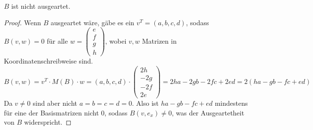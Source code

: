 \documentclass[10pt,a4paper]{article}
\begin{document}
$B$ ist nicht ausgeartet.
\begin{proof}
Wenn $B$ ausgeartet wäre, gäbe es ein $v^{T} = (a, b, c, d)$, sodass $B(v, w) = 0$ für alle $w = \begin{pmatrix}
e\\f\\g\\h
\end{pmatrix}$, wobei $v, w$ Matrizen in Koordinatenschreibweise sind.
\begin{equation}
B(v, w) = v^{T} \cdot M(B) \cdot w = (a, b, c, d) \cdot \begin{pmatrix}
2h\\-2g\\-2f\\2e
\end{pmatrix} = 2ha - 2gb - 2fc + 2ed = 2(ha - gb - fc + ed)
\end{equation}
Da $v \ne 0$ sind aber nicht $a = b = c = d = 0$.
Also ist $ha - gb - fc + ed$ mindestens für eine der Basismatrizen nicht $0$, sodass $B(v, e_{x}) \ne 0$, was der Ausgeartetheit von $B$ widerspricht.
\end{proof}
\end{document}

